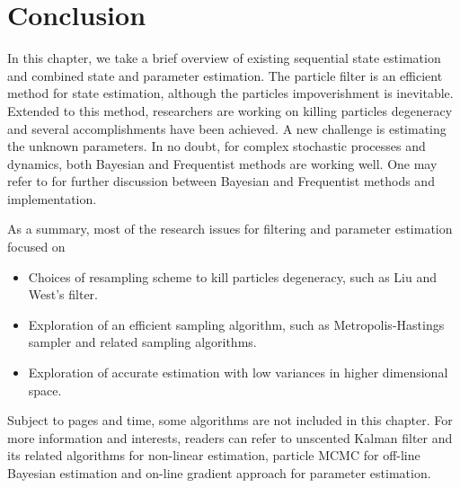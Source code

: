 \section{Conclusion}

In this chapter, we take a brief overview of existing sequential state estimation and combined state and parameter estimation. The particle filter is an efficient method for state estimation, although the particles impoverishment is inevitable. Extended to this method, researchers are working on killing particles degeneracy and several accomplishments have been achieved. A new challenge is estimating the unknown parameters. In no doubt, for complex stochastic processes and dynamics, both Bayesian and Frequentist methods are working well. One may refer to \citep{wakefield2013bayesian} for further discussion between Bayesian and Frequentist methods and implementation. 

As a summary, most of the research issues for filtering and parameter estimation focused on 
\begin{itemize}\itemsep0em 
\item Choices of resampling scheme to kill particles degeneracy, such as Liu and West's filter.
\item Exploration of an efficient sampling algorithm, such as Metropolis-Hastings sampler and related sampling algorithms. 
\item Exploration of accurate estimation with low variances in higher dimensional space. 
\end{itemize}

Subject to pages and time, some algorithms are not included in this chapter. For more information and interests, readers can refer to unscented Kalman filter \citep{wan2000unscented} and its related algorithms for non-linear estimation, particle MCMC \citep{andrieu2010particle} for off-line Bayesian estimation and on-line gradient approach \citep{poyiadjis2005maximum} for parameter estimation. 




